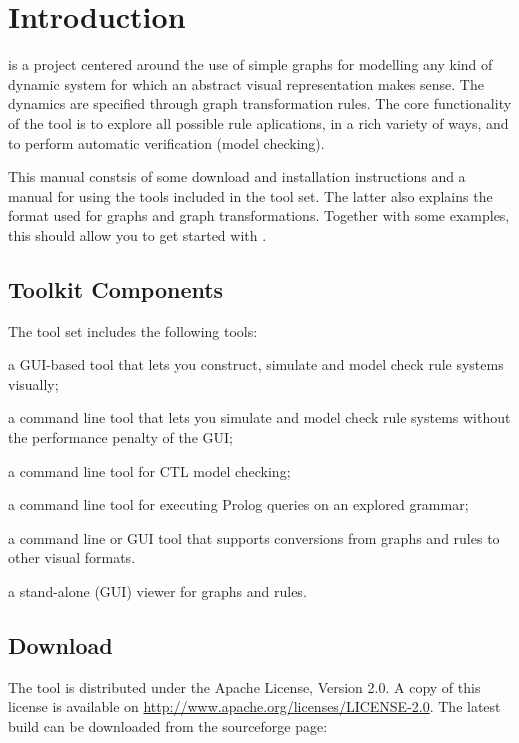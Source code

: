 \clearpage
\section{Introduction}

\GROOVE is a project centered around the use of simple graphs for modelling
any kind of dynamic system for which an abstract visual representation makes sense. The dynamics are specified through graph transformation rules. The core functionality of the tool is to explore all possible rule aplications, in a rich variety of ways, and to perform automatic verification (model checking).

This manual constsis of some download and installation instructions and a
manual for using the tools included in the \GROOVE tool set. The latter also
explains the format used for graphs and graph transformations. Together
with some examples, this should allow you to get started with \GROOVE.

\subsection{Toolkit Components}

The \GROOVE tool set includes the following tools:
\begin{description}\noitemsep
\item[Simulator:] a GUI-based tool that lets you construct, simulate and
  model check rule systems visually;
\item[Generator:] a command line tool that lets you simulate and model check
  rule systems without the performance penalty of the GUI;
\item[ModelChecker:] a command line tool for CTL model checking;
\item[PrologChecker:] a command line tool for executing Prolog queries on an explored grammar;
\item[Imager:] a command line or GUI tool that supports conversions from
  \GROOVE graphs and rules to other visual formats.
\item[Viewer:] a stand-alone (GUI) viewer for \GROOVE graphs and rules.
\end{description}

\subsection{Download}

The \GROOVE tool is distributed under the Apache License, Version 2.0. A copy
of this license is available on
\url{http://www.apache.org/licenses/LICENSE-2.0}.  The latest \GROOVE build
can be downloaded from the \GROOVE sourceforge page:

